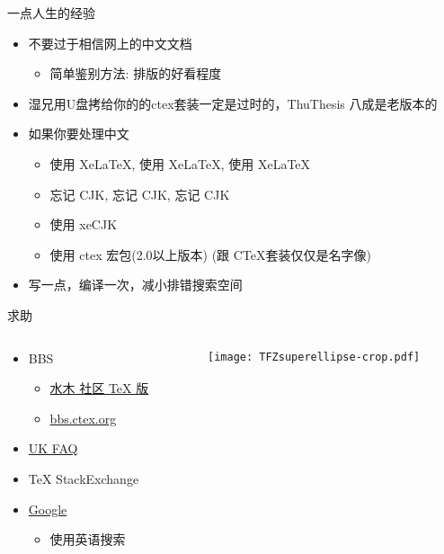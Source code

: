 \begin{frame}{一点人生的经验}
  \begin{itemize}
    \item 不要过于相信网上的中文文档
      \begin{itemize}
        \item 简单鉴别方法: 排版的好看程度
      \end{itemize}
    \item 湿兄用U盘拷给你的的ctex套装一定是过时的，ThuThesis 八成是老版本的
    \item 如果你要处理中文
      \begin{itemize}
        \item 使用 XeLaTeX, 使用 XeLaTeX, 使用 XeLaTeX
        \item 忘记 CJK, 忘记 CJK, 忘记 CJK
        \item 使用 xeCJK
        \item 使用 ctex 宏包(2.0以上版本) (跟 C\TeX 套装仅仅是名字像)
      \end{itemize}
    \item 写一点，编译一次，减小排错搜索空间
  \end{itemize} 
\end{frame}

\begin{frame}{求助}
	\begin{columns}[c]
		\begin{column}{.45\textwidth}
			\begin{itemize}
				\item BBS
					\begin{itemize}
						\item \href{http://www.newsmth.net/nForum/board/TeX}{水木
							社区 TeX 版}
						\item \href{http://bbs.ctex.org/}{bbs.ctex.org}
					\end{itemize}
				\item \href{http://www.tex.ac.uk/cgi-bin/texfaq2html}{UK FAQ}
				\item TeX StackExchange
				\item \href{http://justfuckinggoogleit.com/}{Google}
          \begin{itemize}
            \item 使用英语搜索
          \end{itemize}
			\end{itemize}
		\end{column}
		\begin{column}{.45\textwidth}
			\texttt{[image: TFZsuperellipse-crop.pdf]}
		\end{column}
	\end{columns}
\end{frame}

